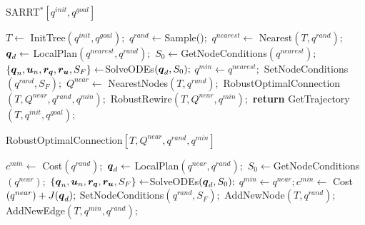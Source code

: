 \begin{algorithm}[t]
    \caption{SARRT$^* [q^{init}, q^{goal}]$}\label{alg:SARRT*}
    \begin{algorithmic}[1]
        \State $T \gets$ InitTree$({q^{init}, q^{goal}});$
            \State $q^{rand} \gets $Sample()$;$
            \State $q^{nearest} \gets$ Nearest$(T,{q^{rand}});$
            \State $\boldsymbol{q}_d \gets$ LocalPlan$({q^{nearest}},{q^{rand}});$
            \State $S_0 \gets $GetNodeConditions$({q^{nearest}});$
            \State $\left \{\boldsymbol{q}_n, \boldsymbol{u}_n, \boldsymbol{r_q}, \boldsymbol{r_u}, S_F \right \}  \gets $SolveODEs$(\boldsymbol{q}_d, S_0);$
                \State $q^{min} \gets q^{nearest};$
                \State SetNodeConditions$({q^{rand}}, S_{F});$
                \State $Q^{near} \gets$ NearestNodes$(T,{q^{rand}});$
                \State RobustOptimalConnection$(T, Q^{near}, q^{rand}, q^{min});$
                \State RobustRewire$(T, Q^{near}, q^{min});$
            \EndIf
        \EndWhile
        \State \textbf{return} GetTrajectory$(T, q^{init}, q^{goal})$;
    \end{algorithmic}
\end{algorithm}

\begin{algorithm}[t]
    \caption{RobustOptimalConnection$[T, Q^{near}, q^{rand}, q^{min}]$}\label{alg:RobustOptimalConnect}
    \begin{algorithmic}[1]
        \State $c^{min} \gets$ Cost$(q^{rand});$
            \State $\boldsymbol{q}_d \gets$ LocalPlan$(q^{near},q^{rand});$
            \State $S_0 \gets $GetNodeConditions$({q^{near}});$
            \State $\left \{\boldsymbol{q}_n, \boldsymbol{u}_n, \boldsymbol{r_q}, \boldsymbol{r_u}, S_F \right \}  \gets $SolveODEs$(\boldsymbol{q}_d, S_0);$
                    \State $q^{min} \gets q^{near}; c^{min} \gets$ Cost$(q^{near}) + J(\boldsymbol{q}_d);$
                    \State SetNodeConditions$({q^{rand}}, S_{F});$
                \EndIf
            \EndIf
        \EndFor
        \State AddNewNode$(T, {q^{rand}});$
        \State AddNewEdge$(T, {q^{min}}, {q^{rand}});$
    \end{algorithmic}
\end{algorithm}

